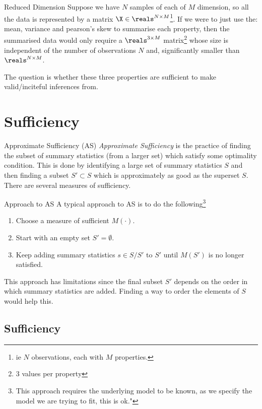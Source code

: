\documentclass[11pt,a4paper]{article}
\begin{document}
  \begin{remark}{Reduced Dimension}
    Suppose we have $N$ samples of each of $M$ dimension, so all the data is represented by a matrix $\X\in\reals^{N\times M}$\footnote{ie $N$ observations, each with $M$ properties.}. If we were to just use the: mean, variance and pearson's skew to summarise each property, then the summarised data would only require a $\reals^{3\times M}$ matrix\footnote{3 values per property} whose size is independent of the number of observations $N$ and, significantly smaller than $\reals^{N\times M}$.
    \par The question is whether these three properties are sufficient to make valid/inciteful inferences from.
  \end{remark}

\section{Sufficiency}

  \begin{proposition}{Approximate Sufficiency (AS)}
    \textit{Approximate Sufficiency} is the practice of finding the subset of summary statistics (from a larger set) which satisfy some optimality condition. This is done by identifying a large set of summary statistics $S$ and then finding a subset $S'\subset S$ which is approximately as good as the superset $S$. There are several measures of sufficiency.
  \end{proposition}

  \begin{proposition}{Approach to AS}
    A typical approach to AS is to do the following\footnote{This approach requires the underlying model to be known, as we specify the model we are trying to fit, this is ok."}
    \begin{enumerate}
      \item Choose a measure of sufficient $M(\cdot)$.
      \item Start with an empty set $S'=\emptyset$.
      \item Keep adding summary statistics $s\in S/S'$ to $S'$ until $M(S')$ is no longer satisfied.
    \end{enumerate}
    This approach has limitations since the final subset $S'$ depends on the order in which summary statistics are added. Finding a way to order the elements of $S$ would help this.
  \end{proposition}

\subsection{Sufficiency}
\end{document}

